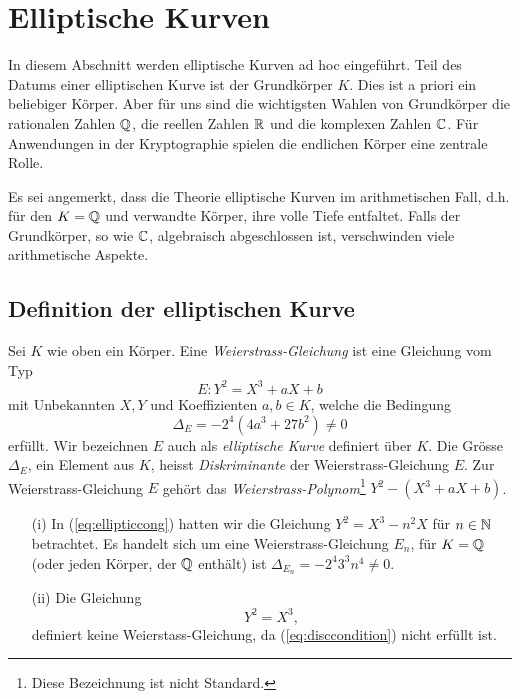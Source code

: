 \chapter{Elliptische Kurven}
\label{kap:ek}

In diesem Abschnitt werden elliptische Kurven ad hoc eingeführt.
Teil des Datums einer elliptischen Kurve ist der Grundkörper $K$. Dies
ist a priori ein beliebiger Körper. Aber für uns sind die wichtigsten
Wahlen von Grundkörper die rationalen Zahlen ${\mathbb{Q}}$, die reellen Zahlen
${\mathbb{R}}$ und die komplexen Zahlen ${\mathbb{C}}$. Für Anwendungen in der
Kryptographie spielen  die endlichen Körper eine zentrale Rolle.

Es sei angemerkt, dass die Theorie elliptische Kurven im
arithmetischen Fall, d.h. für den $K={\mathbb{Q}}$ und verwandte Körper, ihre
volle Tiefe entfaltet. Falls der Grundkörper, so wie ${\mathbb{C}}$,
algebraisch abgeschlossen ist, verschwinden viele arithmetische
Aspekte.

\section{Definition der elliptischen Kurve}

\begin{definition}
  Sei $K$ wie oben ein Körper.
  Eine \emph{Weierstrass-Gleichung} ist eine Gleichung vom Typ
  \begin{equation}
    \label{eq:weierstrass}
    E: Y^2 = X^3 + aX + b
  \end{equation}
  mit Unbekannten $X,Y$ und Koeffizienten $a,b\in K$, welche die
  Bedingung
  \begin{equation}
    \label{eq:disccondition}
    \Delta_E = -2^4(4a^3+27b^2)\not=0
  \end{equation}
  erfüllt. Wir bezeichnen $E$ auch als \emph{elliptische
    Kurve}
  definiert über $K$.
  Die Grösse $\Delta_E$, ein Element aus $K$, heisst
  \emph{Diskriminante}
  der Weierstrass-Gleichung $E$. Zur Weierstrass-Gleichung $E$ gehört
  das \emph{Weierstrass-Polynom}\footnote{Diese Bezeichnung ist nicht
    Standard.} $Y^2- (X^3+aX+b)$.
\end{definition}

\begin{beispiele}\leavevmode
  \begin{enumerate}
  \item [(i)] In (\ref{eq:ellipticcong}) hatten wir die Gleichung $Y^2 = X^3-n^2X$
    für $n\in{\mathbb{N}}$ betrachtet. Es handelt sich um eine
    Weierstrass-Gleichung $E_n$, für $K={\mathbb{Q}}$ (oder jeden Körper, der ${\mathbb{Q}}$
    enthält) ist $\Delta_{E_n} = -2^4 3^3 n^4 \not=0$.
  \item[(ii)] Die Gleichung
    \begin{equation*}
      Y^2 = X^3,
    \end{equation*}
    definiert keine Weierstass-Gleichung, da (\ref{eq:disccondition})
    nicht erfüllt ist.
  \end{enumerate}
\end{beispiele}

